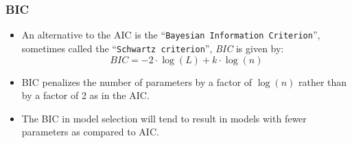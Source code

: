\documentclass{beamer}
\newcommand{\empr}[1]{{\emph{\color{red}#1}}}
\begin{document}
\pagebreak
\begin{frame}
\frametitle{BIC}	
\begin{itemize}
\item An alternative to the AIC is the ``\texttt{Bayesian Information Criterion}'', sometimes called the ``\texttt{Schwartz criterion}'', \empr{BIC} is given by:
\begin{equation}
BIC = -2\cdot \log(L) + k\cdot \log(n)
\end{equation}
\item BIC penalizes the number of parameters by a factor of {\color{red}$\log(n)$} rather than by a factor of 2 as in the AIC.
\item The BIC in model selection will tend to result in models with {\color{red}fewer} parameters as compared to AIC.
\end{itemize}
\end{frame}
\end{document}
